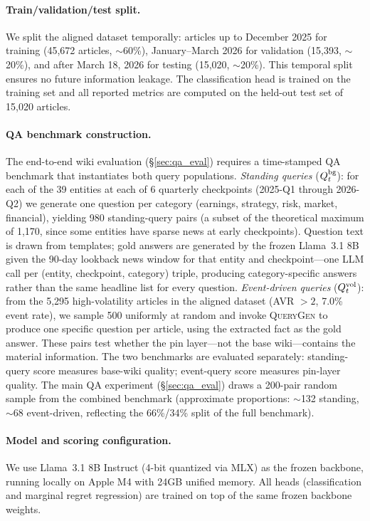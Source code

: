 \documentclass{article}
\begin{document}
\paragraph{Train/validation/test split.}
We split the aligned dataset temporally: articles up to December 2025 for training (45,672 articles, $\sim$60\%), January--March 2026 for validation (15,393, $\sim$20\%), and after March 18, 2026 for testing (15,020, $\sim$20\%).
This temporal split ensures no future information leakage.
The classification head is trained on the training set and all reported metrics are computed on the held-out test set of 15,020 articles.

\paragraph{QA benchmark construction.}
The end-to-end wiki evaluation ({\S}\ref{sec:qa_eval}) requires a time-stamped QA benchmark that instantiates both query populations.
\emph{Standing queries} ($Q_t^{\textup{bg}}$): for each of the 39 entities at each of 6 quarterly checkpoints (2025-Q1 through 2026-Q2) we generate one question per category (earnings, strategy, risk, market, financial), yielding 980 standing-query pairs (a subset of the theoretical maximum of 1,170, since some entities have sparse news at early checkpoints).
Question text is drawn from templates; gold answers are generated by the frozen Llama~3.1 8B given the 90-day lookback news window for that entity and checkpoint---one LLM call per (entity, checkpoint, category) triple, producing category-specific answers rather than the same headline list for every question.
\emph{Event-driven queries} ($Q_t^{\textup{vol}}$): from the 5,295 high-volatility articles in the aligned dataset (AVR $>2$, 7.0\% event rate), we sample 500 uniformly at random and invoke \textsc{QueryGen} to produce one specific question per article, using the extracted fact as the gold answer.
These pairs test whether the pin layer---not the base wiki---contains the material information.
The two benchmarks are evaluated separately: standing-query score measures base-wiki quality; event-query score measures pin-layer quality.
The main QA experiment (\S\ref{sec:qa_eval}) draws a 200-pair random sample from the combined benchmark (approximate proportions: $\sim$132 standing, $\sim$68 event-driven, reflecting the 66\%/34\% split of the full benchmark).

\paragraph{Model and scoring configuration.}
We use Llama~3.1 8B Instruct (4-bit quantized via MLX) as the frozen backbone, running locally on Apple M4 with 24GB unified memory.
All heads (classification and marginal regret regression) are trained on top of the same frozen backbone weights.
\end{document}
